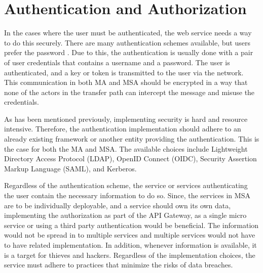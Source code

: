 \section{Authentication and Authorization}
\begin{sloppypar}
    In the cases where the user must be authenticated, the web service needs a
    way to do this securely. There are many authentication schemes available,
    but users prefer the password \citep{passwordisdead}. Due to this, the
    authentication is usually done with a pair of user credentials that contains
    a username and a password. The user is authenticated, and a key or token is
    transmitted to the user via the network. This communication in both MA and
    MSA should be encrypted in a way that none of the actors in the transfer
    path can intercept the message and misuse the credentials. 
\end{sloppypar}
\begin{sloppypar}
    As has been mentioned previously, implementing security is hard and resource
    intensive. Therefore, the authentication implementation should adhere to an
    already existing framework or another entity providing the authentication.
    This is the case for both the MA and MSA. The available choices include
    Lightweight Directory Access Protocol (LDAP), OpenID Connect (OIDC),
    Security Assertion Markup Language (SAML), and Kerberos.
\end{sloppypar}
\begin{sloppypar}
    Regardless of the authentication scheme, the service or services
    authenticating the user contain the necessary information to do so. Since,
    the services in MSA are to be individually deployable, and a service should
    own its own data, implementing the authorization as part of the API Gateway,
    as a single micro service or using a third party authentication would be
    beneficial. The information would not be spread in to multiple services and
    multiple services would not have to have related implementation. In
    addition, whenever information is available, it is a target for thieves and
    hackers. Regardless of the implementation choices, the service must adhere
    to practices that minimize the risks of data breaches. 
\end{sloppypar}

